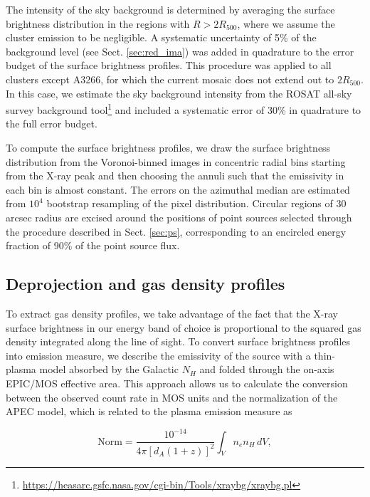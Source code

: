 \documentclass[traditabstract   ]{aa} %
\begin{document}
The intensity of the sky background is determined by averaging the surface brightness distribution in the regions with $R>2R_{500}$, where we assume the cluster emission to be negligible. A systematic uncertainty of 5\% of the background level (see Sect. \ref{sec:red_ima}) was added in quadrature to the error budget of the surface brightness profiles. This procedure was applied to all clusters except A3266, for which the current mosaic does not extend out to $2R_{500}$. In this case, we estimate the sky background intensity from the ROSAT all-sky survey background tool\footnote{\href{https://heasarc.gsfc.nasa.gov/cgi-bin/Tools/xraybg/xraybg.pl}{https://heasarc.gsfc.nasa.gov/cgi-bin/Tools/xraybg/xraybg.pl}} and included a systematic error of 30\% in quadrature to the full error budget.

To compute the surface brightness profiles, we draw the surface brightness distribution from the Voronoi-binned images in concentric radial bins starting from the X-ray peak{ and then choosing the annuli such that the emissivity in each bin is almost constant}. The errors on the azimuthal median are estimated from $10^4$ bootstrap resampling of the pixel distribution. Circular regions of 30 arcsec radius are excised around the positions of point sources selected through the procedure described in Sect. \ref{sec:ps}, corresponding to an encircled energy fraction of 90\% of the point source flux.

\subsection{Deprojection and gas density profiles}

To extract gas density profiles, we take advantage of the fact that the X-ray surface brightness in our energy band of choice is proportional to the squared gas density integrated along the line of sight. To convert surface brightness profiles into emission measure, we describe the emissivity of the source with a thin-plasma model absorbed by the Galactic $N_H$ and folded through the on-axis EPIC/MOS effective area. This approach allows us to calculate the conversion between the observed count rate in MOS units and the normalization of the APEC model, which is related to the plasma emission measure as 

\begin{equation}\mbox{Norm} = \frac{10^{-14}}{4\pi [d_A(1+z)]^2}\int_V n_en_H\, dV,\label{eq:apecnorm}\end{equation}
\end{document}
